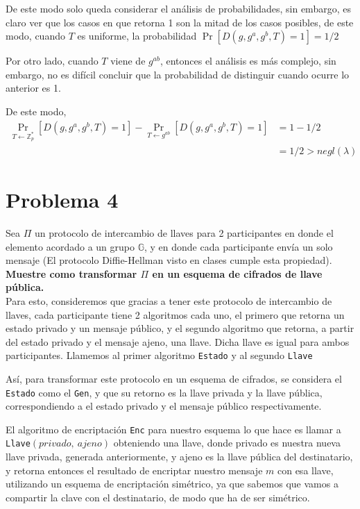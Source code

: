 \documentclass[twoside]{tareas}
\begin{document}
\begin{enumerate}
    De este modo solo queda considerar el análisis de probabilidades, sin embargo, es claro ver que los casos en que retorna 1 son la mitad de los casos posibles, de este modo, cuando $T$ es uniforme, la probabilidad $\Pr[D(g, g^a, g^b, T) = 1] = 1/2$

    Por otro lado, cuando $T$ viene de $g^{ab}$, entonces el análisis es más complejo, sin embargo, no es difícil concluir que la probabilidad de distinguir cuando ocurre lo anterior es 1.

    De este modo,
    \begin{align*}
        \Pr_{T\leftarrow \mathbb{Z}_p^*}[D(g, g^a, g^b, T) = 1] - \Pr_{T\leftarrow g^{ab}}[D(g, g^a, g^b, T) = 1] &= 1 - 1/2\\
        &= 1/2 > negl(\lambda)
    \end{align*}

\end{enumerate}

\section*{Problema 4}

Sea $\Pi$ un protocolo de intercambio de llaves para 2 participantes en donde el elemento acordado a un grupo $\mathbb{G}$, y en donde cada participante envía un solo mensaje (El protocolo Diffie-Hellman visto en clases cumple esta propiedad).\\ \textbf{Muestre como transformar $\Pi$ en un esquema de cifrados de llave pública.}\\

Para esto, consideremos que gracias a tener este protocolo de intercambio de llaves, cada participante tiene 2 algoritmos cada uno, el primero que retorna un estado privado y un mensaje público, y el segundo algoritmo que retorna, a partir del estado privado y el mensaje ajeno, una llave. Dicha llave es igual para ambos participantes. Llamemos al primer algoritmo \texttt{Estado} y al segundo \texttt{Llave}

Así, para transformar este protocolo en un esquema de cifrados, se considera el \texttt{Estado} como el \texttt{Gen}, y que su retorno es la llave privada y la llave pública, correspondiendo a el estado privado y el mensaje público respectivamente.

El algoritmo de encriptación \texttt{Enc} para nuestro esquema lo que hace es llamar a \texttt{Llave}$(privado,\ ajeno)$ obteniendo una llave, donde privado es nuestra nueva llave privada, generada anteriormente, y ajeno es la llave pública del destinatario, y retorna entonces el resultado de encriptar nuestro mensaje $m$ con esa llave, utilizando un esquema de encriptación simétrico, ya que sabemos que vamos a compartir la clave con el destinatario, de modo que ha de ser simétrico.
\end{document}

